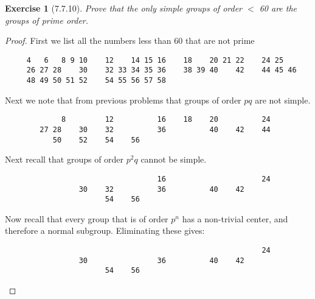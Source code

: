 \documentclass[12pt]{article}
\newtheorem*{exer}{Exercise}
\begin{document}

\begin{exer}[7.7.10]

    Prove that the only simple groups of order $<$ 60 are the groups of
    prime order.

\end{exer}

\begin{proof}

    First we list all the numbers less than 60 that are not prime 

    \begin{verbatim}
     4   6   8 9 10    12    14 15 16    18    20 21 22    24 25
     26 27 28    30    32 33 34 35 36    38 39 40    42    44 45 46
     48 49 50 51 52    54 55 56 57 58
     \end{verbatim}

     Next we note that from previous problems that groups of order $pq$
     are not simple.

     \begin{verbatim}
             8         12          16    18    20          24   
        27 28    30    32          36          40    42    44      
           50    52    54    56      
     \end{verbatim}

     Next recall that groups of order $p^2q$ cannot be simple.
        
     \begin{verbatim}
                                   16                      24   
                 30    32          36          40    42            
                       54    56      
     \end{verbatim}

     Now recall that every group that is of order $p^n$ has a
     non-trivial center, and therefore a normal subgroup. Eliminating
     these gives:

     \begin{verbatim}
                                                           24   
                 30                36          40    42            
                       54    56      
     \end{verbatim}

\end{proof}

\end{document}
